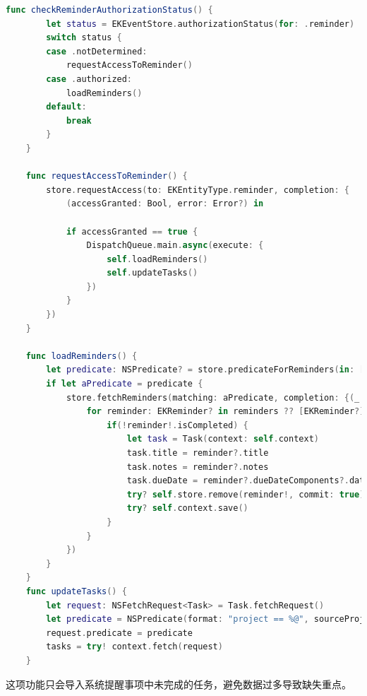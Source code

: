 \begin{lstlisting}[language={Swift}, caption={请求提醒事项权限并导入系统代码逻辑}]
	func checkReminderAuthorizationStatus() {
        let status = EKEventStore.authorizationStatus(for: .reminder)
        switch status {
        case .notDetermined:
            requestAccessToReminder()
        case .authorized:
            loadReminders()
        default:
            break
        }
    }
    
    func requestAccessToReminder() {
        store.requestAccess(to: EKEntityType.reminder, completion: {
            (accessGranted: Bool, error: Error?) in
            
            if accessGranted == true {
                DispatchQueue.main.async(execute: {
                    self.loadReminders()
                    self.updateTasks()
                })
            }
        })
    }
    
    func loadReminders() {
        let predicate: NSPredicate? = store.predicateForReminders(in: [store.defaultCalendarForNewReminders()!])
        if let aPredicate = predicate {
            store.fetchReminders(matching: aPredicate, completion: {(_ reminders: [EKReminder]?) -> Void in
                for reminder: EKReminder? in reminders ?? [EKReminder?]() {
                    if(!reminder!.isCompleted) {
                        let task = Task(context: self.context)
                        task.title = reminder?.title
                        task.notes = reminder?.notes
                        task.dueDate = reminder?.dueDateComponents?.date
                        try? self.store.remove(reminder!, commit: true)
                        try? self.context.save()
                    }
                }
            })
        }
    }
    func updateTasks() {
        let request: NSFetchRequest<Task> = Task.fetchRequest()
        let predicate = NSPredicate(format: "project == %@", sourceProject ?? 0)
        request.predicate = predicate
        tasks = try! context.fetch(request)
    }
\end{lstlisting}

这项功能只会导入系统提醒事项中未完成的任务，避免数据过多导致缺失重点。

